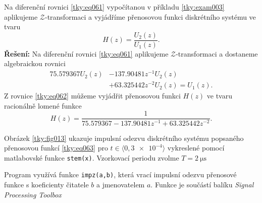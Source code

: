 \begin{mdframed}[style=mdexam]
  \begin{example}\label{tky:exam004}
    Na diferenční rovnici \ref{tky:eq061} vypočítanou v příkladu \ref{tky:exam003} aplikujeme
    \(\mathcal{Z}\)-transformaci a vyjádříme přenosovou funkci diskrétního systému ve tvaru
    \begin{equation*}
      H(z) = \dfrac{U_2(z)}{U_1(z)}.
    \end{equation*}
    \noindent\textbf{Řešení:}
    Na diferenční rovnici \ref{tky:eq061} aplikujeme \(\mathcal{Z}\)-transformaci a dostaneme
    algebraickou rovnici
    \begin{align}
      \num{75.579367}U_2(z) &- \num{137.90481}z^{-1}U_2(z)                       \nonumber \\
                            &+ \num{63.325442}z^{-2}U_2(z) = U_1(z).             \label{tky:eq062}
    \end{align}
    Z rovnice \ref{tky:eq062} můžeme vyjádřit přenosovou funkci \(H(z)\) ve tvaru racionálně lomené
    funkce
    \begin{equation}\label{tky:eq063}
      H(z) = \dfrac{1}{\num{75.579367}-\num{137.90481}z^{-1}+\num{63.325442}z^{-2}}.
    \end{equation}
    
    {\centering
      \captionsetup{type=figure}
      \label{tky:fig013}
    \par}
    Obrázek \ref{tky:fig013} ukazuje impulsní odezvu diskrétního systému popsaného přenosovou funkcí
    \ref{tky:eq063} pro \(t\in\langle0,\num{3e-4}\rangle\) vykreslené pomocí matlabovské funkce
    \lstinline[style=luaMatlabText]!stem(x)!. Vzorkovací periodu zvolme \(T = \SI{2}{\us}\)

    Program využívá funkce \lstinline[style=luaMatlabText]!impz(a,b)!, která vrací impulsní odezvu
    přenosové funkce s koeficienty čitatele \(b\) a jmenovatelem \(a\). Funkce je součástí balíku 
    \emph{Signal Processing Toolbox}    
  \end{example} 

  
\end{mdframed}